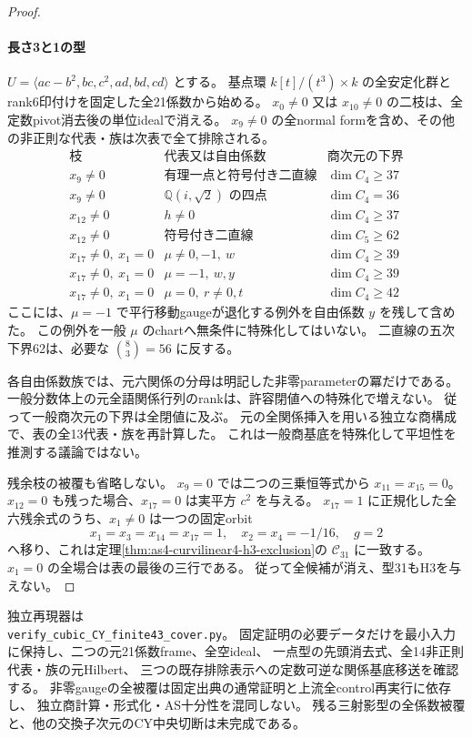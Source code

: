 \begin{proof}
\paragraph{長さ3と1の型}
$U=\langle ac-b^2,bc,c^2,ad,bd,cd\rangle$ とする。
基点環 $k[t]/(t^3)\times k$ の全安定化群とrank6印付けを固定した全21係数から始める。
$x_0\ne0$ 又は $x_{10}\ne0$ の二枝は、全定数pivot消去後の単位idealで消える。
$x_9\ne0$ の全normal formを含め、その他の非正則な代表・族は次表で全て排除される。
\[
\begin{array}{c|c|c}
\text{枝}&\text{代表又は自由係数}&\text{商次元の下界}\\\hline
x_9\ne0&\text{有理一点と符号付き二直線}&\dim C_4\ge37\\
x_9\ne0&\mathbb Q(i,\sqrt2)\text{ の四点}&\dim C_4=36\\
x_{12}\ne0&h\ne0&\dim C_4\ge37\\
x_{12}\ne0&\text{符号付き二直線}&\dim C_5\ge62\\
x_{17}\ne0,\ x_1=0&\mu\ne0,-1,\ w&\dim C_4\ge39\\
x_{17}\ne0,\ x_1=0&\mu=-1,\ w,y&\dim C_4\ge39\\
x_{17}\ne0,\ x_1=0&\mu=0,\ r\ne0,t&\dim C_4\ge42
\end{array}
\]
ここには、$\mu=-1$ で平行移動gaugeが退化する例外を自由係数 $y$ を残して含めた。
この例外を一般 $\mu$ のchartへ無条件に特殊化してはいない。
二直線の五次下界62は、必要な $\binom83=56$ に反する。

各自由係数族では、元六関係の分母は明記した非零parameterの冪だけである。
一般分数体上の元全語関係行列のrankは、許容閉値への特殊化で増えない。
従って一般商次元の下界は全閉値に及ぶ。
元の全関係挿入を用いる独立な商構成で、表の全13代表・族を再計算した。
これは一般商基底を特殊化して平坦性を推測する議論ではない。

残余枝の被覆も省略しない。
$x_9=0$ では二つの三乗恒等式から $x_{11}=x_{15}=0$。
$x_{12}=0$ も残った場合、$x_{17}=0$ は実平方 $c^2$ を与える。
$x_{17}=1$ に正規化した全六残余式のうち、$x_1\ne0$ は一つの固定orbit
\[
 x_1=x_3=x_{14}=x_{17}=1,\quad x_2=x_4=-1/16,\quad g=2
\]
へ移り、これは定理\ref{thm:as4-curvilinear4-h3-exclusion}の $\mathcal C_{31}$ に一致する。
$x_1=0$ の全場合は表の最後の三行である。
従って全候補が消え、型31もH3を与えない。
\end{proof}

独立再現器は\\
\texttt{verify\_cubic\_CY\_finite43\_cover.py}。
固定証明の必要データだけを最小入力に保持し、二つの元21係数frame、全空ideal、
一点型の先頭消去式、全14非正則代表・族の元Hilbert、
三つの既存排除表示への定数可逆な関係基底移送を確認する。
非零gaugeの全被覆は固定出典の通常証明と上流全control再実行に依存し、
独立商計算・形式化・AS十分性を混同しない。
残る三射影型の全係数被覆と、他の交換子次元のCY中央切断は未完成である。

